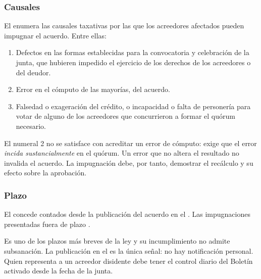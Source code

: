 \subsubsection{Causales}

El  enumera las causales taxativas por las que los acreedores afectados pueden
impugnar el acuerdo. Entre ellas:

\begin{enumerate}
  \item Defectos en las formas establecidas para la convocatoria y celebración de la junta,
  que hubieren impedido el ejercicio de los derechos de los acreedores o del deudor.
  \item Error en el cómputo de las mayorías,  del acuerdo.
  \item Falsedad o exageración del crédito, o incapacidad o falta de personería para votar
  de alguno de los acreedores que concurrieron a formar el quórum necesario.
\end{enumerate}


\begin{foco}
El numeral 2 no se satisface con acreditar un error de cómputo: exige que el error
\emph{incida sustancialmente} en el quórum. Un error que no altera el resultado no invalida
el acuerdo. La impugnación debe, por tanto, demostrar el recálculo y su efecto sobre la
aprobación.
\end{foco}

\subsubsection{Plazo}

El  concede  contados desde la publicación del acuerdo en el
\boletin{}. Las impugnaciones presentadas fuera de plazo .

\begin{alerta}
Es uno de los plazos más breves de la ley y su incumplimiento no admite subsanación. La
publicación en el \boletin{} es la única señal: no hay notificación personal. Quien
representa a un acreedor disidente debe tener el control diario del Boletín activado desde
la fecha de la junta.
\end{alerta}

